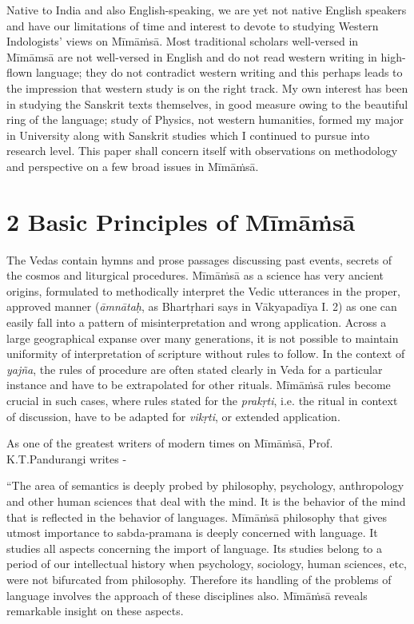 Native to India and also English-speaking, we are yet not native English speakers and have our limitations of time and interest to devote to studying Western Indologists’ views on Mīmāṁsā. Most traditional scholars well-versed in Mīmāmsā are not well-versed in English and do not read western writing in high-flown language; they do not contradict western writing and this perhaps leads to the impression that western study is on the right track. My own interest has been in studying the Sanskrit texts themselves, in good measure owing to the beautiful ring of the language; study of Physics, not western humanities, formed my major in University along with Sanskrit studies which I continued to pursue into research level. This paper shall concern itself with observations on methodology and perspective on a few broad issues in Mīmāṁsā.


\section*{2 Basic Principles of Mīmāṁsā}

The Vedas contain hymns and prose passages discussing past events, secrets of the cosmos and liturgical procedures. Mīmāṁsā as a science has very ancient origins, formulated to methodically interpret the Vedic utterances in the proper, approved manner (\textit{āmnātaḥ}, as Bhartṛhari says in Vākyapadīya I. 2) as one can easily fall into a pattern of misinterpretation and wrong application. Across a large geographical expanse over many generations, it is not possible to maintain uniformity of interpretation of scripture without rules to follow. In the context of \textit{yajña}, the rules of procedure are often stated clearly in Veda for a particular instance and have to be extrapolated for other rituals. Mīmāṁsā rules become crucial in such cases, where rules stated for the \textit{prakṛti}, i.e. the ritual in context of discussion, have to be adapted for \textit{vikṛti}, or extended application.

As one of the greatest writers of modern times on Mīmāṁsā, Prof. K.T.Pandurangi writes -

\begin{myquote}
“The area of semantics is deeply probed by philosophy, psychology, anthropology and other human sciences that deal with the mind. It is the behavior of the mind that is reflected in the behavior of languages. Mīmāṁsā philosophy that gives utmost importance to sabda-pramana is deeply concerned with language. It studies all aspects concerning the import of language. Its studies belong to a period of our intellectual history when psychology, sociology, human sciences, etc, were not bifurcated from philosophy. Therefore its handling of the problems of language involves the approach of these disciplines also. Mīmāṁsā reveals remarkable insight on these aspects.
\end{myquote}

